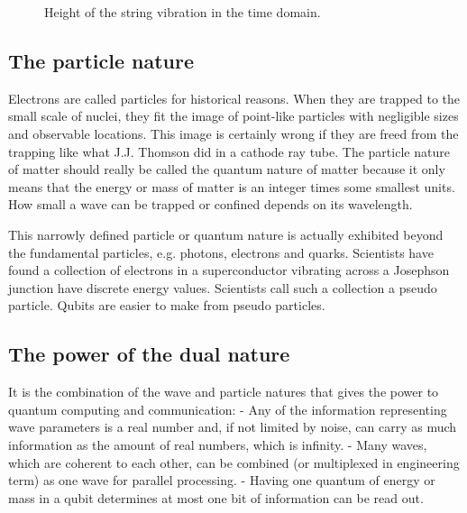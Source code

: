 \documentclass[oneside, letter, 12pt]{book}
\begin{document}
\begin{figure}[h]\label{Wave}
\caption{Height of the string vibration in the time domain.}
\end{figure}

\subsection{The particle nature}
Electrons are called particles for historical reasons. When they are trapped to the small scale of nuclei, they fit the image of point-like particles with negligible sizes and observable locations. This image is certainly wrong if they are freed from the trapping like what J.J. Thomson did in a cathode ray tube. The particle nature of matter should really be called the quantum nature of matter because it only means that the energy or mass of matter is an integer times some smallest units. How small a wave can be trapped or confined depends on its wavelength.

This narrowly defined particle or quantum nature is actually exhibited beyond the fundamental particles, e.g. photons, electrons and quarks. Scientists have found a collection of electrons in a superconductor vibrating across a Josephson junction have discrete energy values. Scientists call such a collection a pseudo particle. Qubits are easier to make from pseudo particles.

\subsection{The power of the dual nature}
It is the combination of the wave and particle natures that gives the power to quantum computing and communication:
- Any of the information representing wave parameters is a real number and, if not limited by noise, can carry as much information as the amount of real numbers, which is infinity.
- Many waves, which are coherent to each other, can be combined (or multiplexed in engineering term) as one wave for parallel processing.
- Having one quantum of energy or mass in a qubit determines at most one bit of information can be read out.
\end{document}
